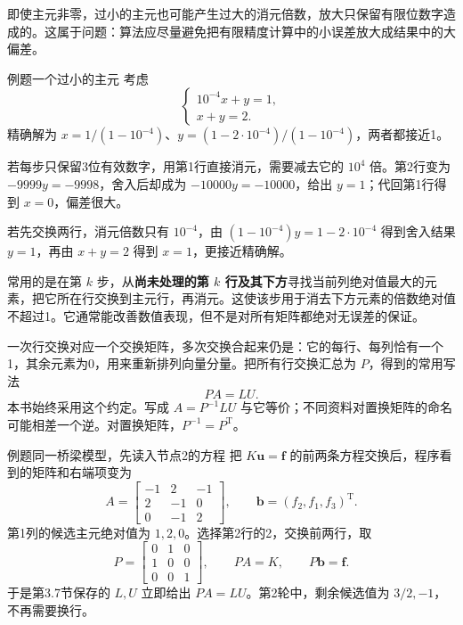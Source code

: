 \documentclass[a4paper,12pt,twoside,openany,fontset=none]{ctexbook}
\newcounter{example}[chapter]
\newenvironment{example}[1][]{\begin{exBox}{例题}{#1}}{\end{exBox}}
\numberwithin{equation}{chapter}
\begin{document}
即使主元非零，过小的主元也可能产生过大的消元倍数，放大只保留有限位数字造成的。这属于问题：算法应尽量避免把有限精度计算中的小误差放大成结果中的大偏差。

\begin{example}[一个过小的主元]
考虑
\[
 \begin{cases}10^{-4}x+y=1,\\x+y=2.\end{cases}
\]
精确解为 $x=1/(1-10^{-4})$、$y=(1-2\cdot10^{-4})/(1-10^{-4})$，两者都接近1。

若每步只保留3位有效数字，用第1行直接消元，需要减去它的 $10^4$ 倍。第2行变为 $-9999y=-9998$，舍入后却成为 $-10000y=-10000$，给出 $y=1$；代回第1行得到 $x=0$，偏差很大。

若先交换两行，消元倍数只有 $10^{-4}$，由 $(1-10^{-4})y=1-2\cdot10^{-4}$ 得到舍入结果 $y=1$，再由 $x+y=2$ 得到 $x=1$，更接近精确解。
\end{example}

常用的是在第 $k$ 步，从\textbf{尚未处理的第 $k$ 行及其下方}寻找当前列绝对值最大的元素，把它所在行交换到主元行，再消元。这使该步用于消去下方元素的倍数绝对值不超过1。它通常能改善数值表现，但不是对所有矩阵都绝对无误差的保证。

一次行交换对应一个交换矩阵，多次交换合起来仍是：它的每行、每列恰有一个1，其余元素为0，用来重新排列向量分量。把所有行交换汇总为 $P$，得到的常用写法
\[
 \boxed{PA=LU.}
\]
本书始终采用这个约定。写成 $A=P^{-1}LU$ 与它等价；不同资料对置换矩阵的命名可能相差一个逆。对置换矩阵，$P^{-1}=P^{\mathrm T}$。


\begin{example}[同一桥梁模型，先读入节点2的方程]
把 $K\boldsymbol u=\boldsymbol f$ 的前两条方程交换后，程序看到的矩阵和右端项变为
\[
 A=\begin{bmatrix}-1&2&-1\\2&-1&0\\0&-1&2\end{bmatrix},\qquad
 \boldsymbol b=(f_2,f_1,f_3)^{\mathrm T}.
\]
第1列的候选主元绝对值为 $1,2,0$。选择第2行的2，交换前两行，取
\[
 P=\begin{bmatrix}0&1&0\\1&0&0\\0&0&1\end{bmatrix},\qquad
 PA=K,\qquad P\boldsymbol b=\boldsymbol f.
\]
于是第3.7节保存的 $L,U$ 立即给出 $PA=LU$。第2轮中，剩余候选值为 $3/2,-1$，不再需要换行。
\end{example}
\end{document}
